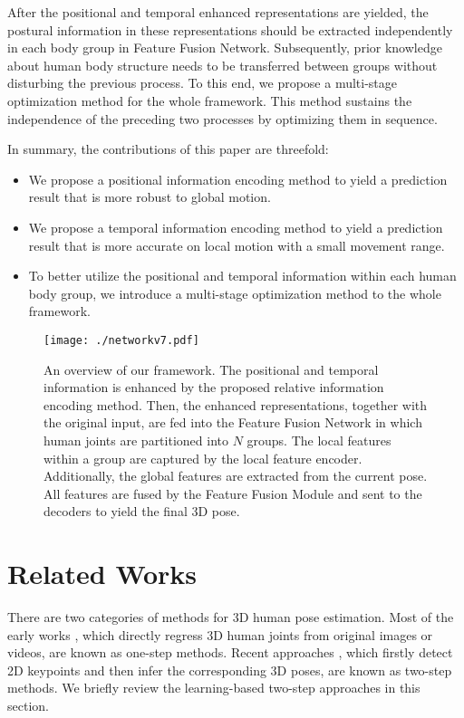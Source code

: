 \documentclass[sigconf]{acmart}
\begin{document}
After the positional and temporal enhanced representations are yielded, the postural information in these representations should be extracted independently in each body group in Feature Fusion Network. Subsequently, prior knowledge about human body structure needs to be transferred between groups without disturbing the previous process. To this end, we propose a multi-stage optimization method for the whole framework. This method sustains the independence of the preceding two processes by optimizing them in sequence.


In summary, the contributions of this paper are threefold:
\begin{itemize}
  \item We propose a positional information encoding method to yield a prediction result that is more robust to global motion.
  \item We propose a temporal information encoding method to yield a prediction result that is more accurate on local motion with a small movement range.
  \item To better utilize the positional and temporal information within each human body group, we introduce a multi-stage optimization method to the whole framework.
\end{itemize}



\begin{figure*}
  \texttt{[image: ./networkv7.pdf]}
  \vspace{-0.4cm}
  \caption{An overview of our framework. The positional and temporal information is enhanced by the proposed relative information encoding method. Then, the enhanced representations, together with the original input, are fed into the Feature Fusion Network in which human joints are partitioned into $N$ groups. The local features within a group are captured by the local feature encoder. Additionally, the global features are extracted from the current pose. All features are fused by the Feature Fusion Module and sent to the decoders to yield the final 3D pose. }
  \vspace{-0.2cm}
  \label{img2}
\end{figure*}



\section{Related Works}
There are two categories of methods for 3D human pose estimation. Most of the early works \cite{pavlakos2017coarse,li20143d,tekin2016structured,rogez2017lcr}, which directly regress 3D human joints from original images or videos, are known as one-step methods. Recent approaches \cite{jllo20193d,martinez2017simple,cai2019exploiting,chen20173d,iqbal2020weakly}, which firstly detect 2D keypoints and then infer the corresponding 3D poses, are known as two-step methods. We briefly review the learning-based two-step approaches in this section.
\end{document}
